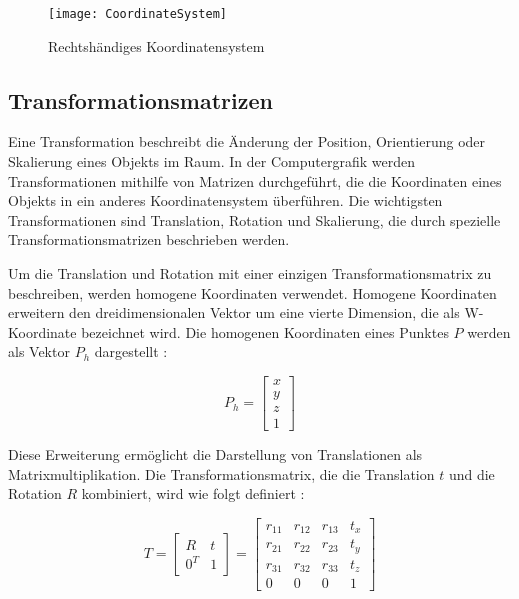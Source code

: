 \begin{figure}
    \centering
    \texttt{[image: CoordinateSystem]}
    \caption{Rechtshändiges Koordinatensystem \cite{appledevdoc}\label{fig:Koordinatensystem}}\par
\end{figure}

\subsection{Transformationsmatrizen}

Eine Transformation beschreibt die Änderung der Position, Orientierung oder Skalierung eines Objekts im Raum. In der Computergrafik werden Transformationen mithilfe von Matrizen durchgeführt, die die Koordinaten eines Objekts in ein anderes Koordinatensystem überführen. Die wichtigsten Transformationen sind Translation, Rotation und Skalierung, die durch spezielle Transformationsmatrizen beschrieben werden. \cite{doerner2022virtual, gao2021vSLAM, pezzi2021matrices}

Um die Translation und Rotation mit einer einzigen Transformationsmatrix zu beschreiben, werden homogene Koordinaten verwendet. Homogene Koordinaten erweitern den dreidimensionalen Vektor um eine vierte Dimension, die als W-Koordinate bezeichnet wird. Die homogenen Koordinaten eines Punktes \(P\) werden als Vektor \(P_h\) dargestellt \cite{doerner2022virtual, gao2021vSLAM, freescale2010math3d}:

\begin{equation}
P_h = \begin{bmatrix} x \\ y \\ z \\ 1 \end{bmatrix}
\end{equation}

Diese Erweiterung ermöglicht die Darstellung von Translationen als Matrixmultiplikation. Die Transformationsmatrix, die die Translation \( t \) und die Rotation \( R \) kombiniert, wird wie folgt definiert \cite{doerner2022virtual, gao2021vSLAM, freescale2010math3d}:

\begin{equation}
T = \begin{bmatrix} R & t \\ 0^T & 1 \end{bmatrix} = 
\begin{bmatrix} 
    r_{11} & r_{12} & r_{13} & t_x \\ 
    r_{21} & r_{22} & r_{23} & t_y \\ 
    r_{31} & r_{32} & r_{33} & t_z \\ 
    0 & 0 & 0 & 1 
\end{bmatrix}
\end{equation}

